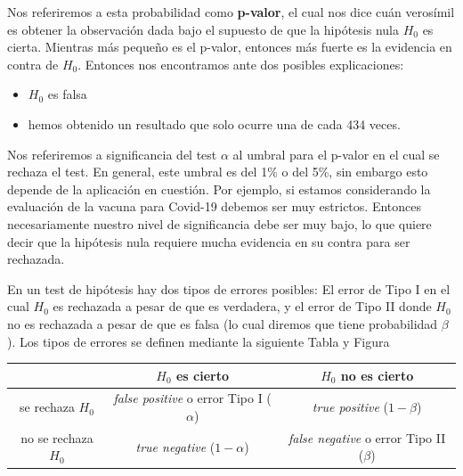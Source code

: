 Nos referiremos a esta probabilidad como \textbf{p-valor}, el cual nos dice cuán verosímil es obtener la observación dada bajo el supuesto de que la hipótesis nula $H_0$ es cierta. Mientras más pequeño es el p-valor, entonces más fuerte es la evidencia en contra de $H_0$. Entonces nos encontramos ante dos posibles explicaciones: 
\begin{itemize}
 	\item $H_0$ es falsa
 	\item hemos obtenido un resultado que solo ocurre una de cada 434 veces. 
 \end{itemize} 

Nos referiremos a significancia del test $\alpha$ al umbral para el p-valor en el cual se rechaza el test. En general, este umbral es del 1\% o del 5\%, sin embargo esto depende de la aplicación en cuestión. Por ejemplo, si estamos considerando la evaluación de la vacuna para Covid-19 debemos ser muy estrictos. Entonces necesariamente nuestro nivel de significancia debe ser muy bajo, lo que quiere decir que la hipótesis nula requiere mucha evidencia en su contra para ser rechazada. 

En un test de hipótesis hay dos tipos de errores posibles: El error de Tipo I en el cual $H_0$ es rechazada a pesar de que es verdadera, y el error de Tipo II donde $H_0$ no es rechazada a pesar de que es falsa (lo cual diremos que tiene probabilidad $\beta$). Los tipos de errores se definen mediante la siguiente Tabla y Figura 

\vspace{1em}
\begin{center}
	\begin{tabular}{c|cc}
			  & $H_0$ es cierto & $H_0$ no es cierto  \\
			\hline
			se rechaza $H_0$  & \emph{false positive} o error Tipo I ($\alpha$) & \emph{true positive} ($1-\beta$)    \\
			no se rechaza $H_0$  & \emph{true negative} ($1-\alpha$) & \emph{false negative} o error Tipo II ($\beta$)
	\end{tabular}
\end{center}

